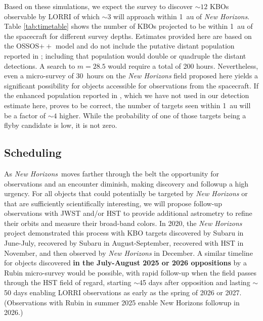 \documentclass[modern,linenumbers,trackchanges,preprint]{aastex631}
\newcommand\nh{\textit{New Horizons}}
\begin{document}
Based on these simulations, we expect the survey to discover $\sim12$ KBOs observable by LORRI of which $\sim$3 will approach within 1~au of {\it New Horizons}.
Table \ref{tab:timetable} shows the number of KBOs projected to be within 1~au of the spacecraft for different survey depths. Estimates provided here are based on the OSSOS$++$ model and do not include the putative distant population reported in \citep{Fraser2024PSJ}; including that population would double or quadruple the distant detections. 
A search to $m=28.5$ would require a total of 200 hours. Nevertheless, even a micro-survey of 30~hours on the {\it New Horizons} field proposed here yields a significant possibility for objects accessible for observations from the spacecraft. 
If the enhanced population reported in \citep{Fraser2024PSJ}, which we have not used in our detection estimate here, proves to be correct, the number of targets seen within 1~au will be a factor of $\sim4$ higher. 
While the probability of one of those targets being a flyby candidate is low, it is not zero.

\subsection{Scheduling}

As \nh\ moves farther through the belt the opportunity for observations and an encounter diminish, making discovery and followup a high urgency. For all objects that could potentially be targeted by {\it New Horizons} or that are sufficiently scientifically interesting, we will propose follow-up observations with JWST and/or HST to provide additional astrometry to refine their orbits and measure their broad-band colors.
In 2020, the {\it New Horizons} project demonstrated this process with KBO targets discovered by Subaru in June-July, recovered by Subaru in August-September, recovered with HST in November, and then observed by {\it New Horizons} in December.
A similar timeline for objects discovered {\bf in the July-August 2025 or 2026 oppositions} by a Rubin micro-survey would be possible, with rapid follow-up when the field passes through the HST field of regard, starting $\sim$45 days after opposition and lasting $\sim$50 days enabling LORRI observations as early as the spring of 2026 or 2027. (Observations with Rubin in summer 2025 enable New Horizons followup in 2026.)

\begin{figure}
\end{figure}
\end{document}
